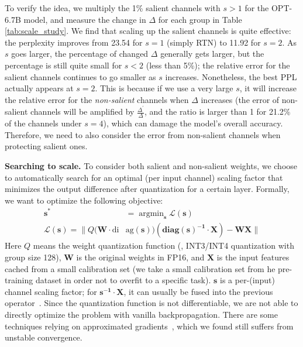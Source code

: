To verify the idea, we multiply the 1\% salient channels with $s>1$ for the OPT-6.7B model, and measure the change in $\Delta$ for each group in Table \ref{tab:scale_study}. We find that scaling up the salient channels is quite effective: the perplexity improves from 23.54 for $s=1$ (simply RTN) to 11.92 for $s=2$. 
As $s$ goes larger, the percentage of changed $\Delta$ generally gets larger, but the percentage is still quite small for $s<2$ (less than 5\%); the relative error for the salient channels continues to go smaller as $s$ increases. Nonetheless, the best PPL actually appears at $s=2$. This is because if we use a very large $s$, it will increase the relative error for the \emph{non-salient} channels when $\Delta$ increases (the error of non-salient channels will be amplified by $\frac{\Delta^{'}}{\Delta}$, and the ratio is larger than 1 for 21.2\% of the channels under $s=4$), which can damage the model's overall accuracy. Therefore, we need to also consider the error from non-salient channels when protecting salient ones. 









\textbf{Searching to scale. }
To consider both salient and non-salient weights, we choose to automatically search for an optimal (per input channel) scaling factor that minimizes the output difference after quantization for a certain layer. Formally, we want to optimize the following objective:
\begin{equation}
\begin{aligned}
    \mathbf{s}^* &= \mathop{\arg\min}_{\mathbf{s}} \mathcal{L}(\mathbf{s}) \\  
    \mathcal{L}(\mathbf{s}) = \lVert Q(\mathbf{W}\cdot \text{di}&\text{ag}(\mathbf{s}))  (\mathbf{\text{diag}(s)^{-1}} \cdot \mathbf{X}) - \mathbf{W}\mathbf{X}  \rVert
\end{aligned}
\end{equation}
Here $Q$ means the weight quantization function (\eg, INT3/INT4 quantization with group size 128), $\mathbf{W}$ is the original weights in FP16, and $\mathbf{X}$ is the input features cached from a small calibration set (we take a small calibration set from he pre-training dataset in order not to overfit to a specific task). $\mathbf{s}$ is a per-(input) channel scaling factor; for $\mathbf{s^{-1}} \cdot \mathbf{X}$, it can usually be fused into the previous operator~\cite{wei2022outlier, xiao2022smoothquant}.
Since the quantization function is not differentiable, we are not able to directly optimize the problem with vanilla backpropagation. There are some techniques relying on approximated gradients~\cite{bengio2013estimating, esser2019learned}, which we found still suffers from unstable convergence.  

